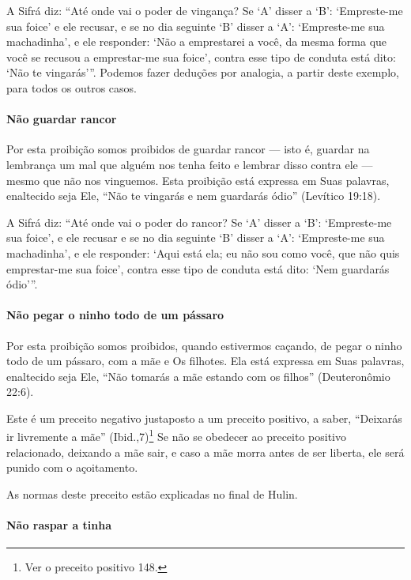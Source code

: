 A Sifrá diz: ``Até onde vai o poder de vingança? Se `A' disser a `B':
`Empreste-me sua foice' e ele recusar, e se no dia seguinte `B' disser a
`A': `Empreste-me sua machadinha', e ele responder: `Não a emprestarei a
você, da mesma forma que você se recusou a emprestar-me sua foice',
contra esse tipo de conduta está dito: `Não te vingarás'''. Podemos
fazer deduções por analogia, a partir deste exemplo, para todos os
outros casos.

\paragraph{Não guardar rancor}

Por esta proibição somos proibidos de guardar rancor --- isto é,
guardar na lembrança um mal que alguém nos tenha feito e lembrar disso
contra ele --- mesmo que não nos vinguemos. Esta proibição está expressa
em Suas palavras, enaltecido seja Ele, ``Não te vingarás e nem
guardarás ódio'' (Levítico 19:18).

A Sifrá diz: ``Até onde vai o poder do rancor? Se `A' disser a `B':
`Empreste-me sua foice', e ele recusar e se no dia seguinte `B' disser a
`A': `Empreste-me sua machadinha', e ele responder: `Aqui está ela; eu
não sou como você, que não quis emprestar-me sua foice', contra esse
tipo de conduta está dito: `Nem guardarás ódio'''.

\paragraph{Não pegar o ninho todo de um pássaro}

Por esta proibição somos proibidos, quando estivermos caçando, de pegar
o ninho todo de um pássaro, com a mãe e Os filhotes. Ela está expressa
em Suas palavras, enaltecido seja Ele, ``Não tomarás a mãe estando com
os filhos'' (Deuteronômio 22:6).

Este é um preceito negativo justaposto a um preceito positivo, a saber,
``Deixarás ir livremente a mãe'' (Ibid.,7)\footnote{Ver o preceito positivo 148.} Se não
se obedecer ao preceito positivo relacionado, deixando a mãe sair, e caso a mãe morra antes de ser liberta, ele será punido com o açoitamento.

As normas deste preceito estão explicadas no final de Hulin.

\paragraph{Não raspar a tinha}

